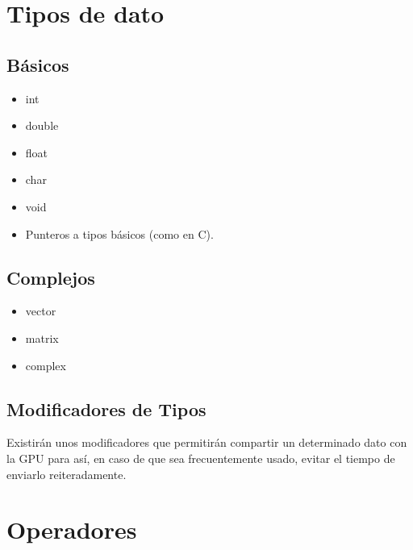 \documentclass[12pt,a4paper]{article}
\begin{document}
\section{Tipos de dato}
\subsection{Básicos}
\begin{itemize}
\item int
\item double
\item float
\item char
\item void
\item Punteros a tipos básicos (como en C).
\end{itemize}
\subsection{Complejos}
\begin{itemize}
\item vector
\item matrix
\item complex
\end{itemize}
\subsection{Modificadores de Tipos}
Existirán unos modificadores que permitirán compartir un determinado dato con la
GPU para así, en caso de que sea frecuentemente usado, evitar el tiempo de
enviarlo reiteradamente.
\section{Operadores}
\end{document}
